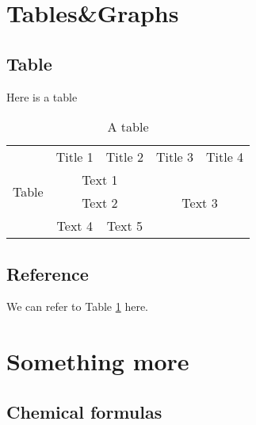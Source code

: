 \documentclass{article}[12pt]
\begin{document}
\section{Tables\&Graphs}
	\subsection{Table}
		Here is a table
		\begin{table}[!h]
			\centering
			\begin{tabular}{|c|c|c|c|c|}
				\hline
				\multirow{4}{*}{Table} & Title 1 & Title 2 & Title 3 & Title 4 \\
				\cline{2-5}
				 & \multicolumn{2}{c|}{Text 1} & \multicolumn{2}{c|}{\multirow{3}{*}{Text 3}} \\
				\cline{2-3}
				& \multicolumn{2}{c|}{Text 2} & \multicolumn{2}{c|}{} \\
				\cline{2-3}
				& Text 4 & Text 5 & \multicolumn{2}{c|}{} \\
				\hline
			\end{tabular}
			\caption{A table}
			\label{table-1}
		\end{table}
	\subsection{Reference}
	We can refer to Table \ref{table-1} here.
\section{Something more}
 	\subsection{Chemical formulas}
 		\\ %
\end{document}
